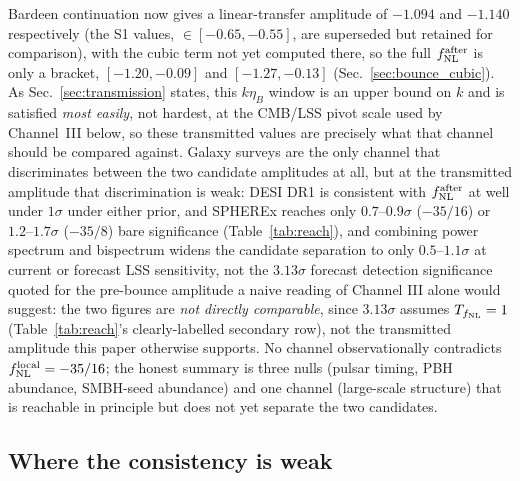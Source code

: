 \documentclass[aps,prd,twocolumn,superscriptaddress,nofootinbib,longbibliography]{revtex4-2}
\newcommand{\fnl}{f_{\rm NL}}
\newcommand{\fnlloc}{f_{\rm NL}^{\rm local}}
\begin{document}
Bardeen continuation now gives a linear-transfer amplitude of $-1.094$
and $-1.140$ respectively (the S1 values, $\in[-0.65,-0.55]$, are
superseded but retained for comparison), with the cubic term not yet
computed there, so the full $\fnl^{\rm after}$ is only a bracket,
$[-1.20,-0.09]$ and $[-1.27,-0.13]$ (Sec.~\ref{sec:bounce_cubic}). As
Sec.~\ref{sec:transmission} states, this $k\eta_B$ window is an upper bound
on $k$ and is satisfied \emph{most easily}, not hardest, at the CMB/LSS pivot
scale used by Channel~III below, so these transmitted values are precisely
what that channel should be compared against. Galaxy surveys are the only
channel that discriminates between the two candidate amplitudes at all, but
at the transmitted amplitude that discrimination is weak: DESI DR1 is
consistent with $\fnl^{\rm after}$ at well under $1\sigma$ under either
prior, and SPHEREx reaches only $0.7$--$0.9\sigma$ ($-35/16$) or
$1.2$--$1.7\sigma$ ($-35/8$) bare significance (Table~\ref{tab:reach}), and
combining power spectrum and bispectrum widens the candidate separation to
only $0.5$--$1.1\sigma$ at current or forecast
LSS sensitivity, not the $3.13\sigma$ forecast detection significance quoted
for the pre-bounce
amplitude a naive reading of Channel III alone would suggest: the two
figures are \emph{not directly comparable}, since $3.13\sigma$ assumes
$T_{\fnl}=1$ (Table~\ref{tab:reach}'s clearly-labelled secondary row),
not the transmitted amplitude this paper otherwise supports. No channel
observationally contradicts $\fnlloc=-35/16$; the honest summary is three
nulls (pulsar timing, PBH abundance, SMBH-seed abundance) and one channel
(large-scale structure) that is reachable in principle but does not yet
separate the two candidates.

\subsection{Where the consistency is weak}
\end{document}
